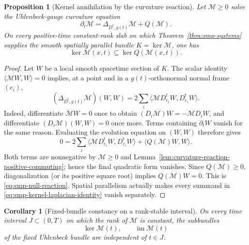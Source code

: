 \documentclass[10pt]{coll-l}
\newtheorem{corollary}[theorem]{Corollary}
\newtheorem{proposition}[theorem]{Proposition}
\theoremstyle{definition}
\theoremstyle{remark}
\numberwithin{section}{chapter}
\numberwithin{equation}{chapter}
\begin{document}
\begin{proposition}[Kernel annihilation by the curvature reaction]
\label{prop:curvature-kernel-annihilation}
Let $\mathcal M\geq0$ solve the Uhlenbeck-gauge curvature equation
\[
                 \partial_t\mathcal M
                 =\Delta_{D^t,g(t)}\mathcal M+Q(\mathcal M).
\]
On every positive-time constant-rank slab on which
Theorem~\ref{thm:smp-systems} supplies the smooth spatially parallel bundle
$K=\ker\mathcal M$, one has
\begin{equation}
       \ker\mathcal M(x,t)\subseteq\ker Q(\mathcal M(x,t)).
                                                        \label{eq:smp-null-reaction}
\end{equation}
\end{proposition}

\begin{proof}
Let $W$ be a local smooth spacetime section of $K$.  The scalar identity
$\langle\mathcal MW,W\rangle=0$ implies, at a point and in a
$g(t)$-orthonormal normal frame $(e_i)$,
\begin{equation}
 (\Delta_{D^t,g(t)}\mathcal M)(W,W)
   =2\sum_i\langle\mathcal M D^t_{e_i}W,D^t_{e_i}W\rangle.
                                                        \label{eq:smp-kernel-laplacian-identity}
\end{equation}
Indeed, differentiate $\mathcal MW=0$ once to obtain
$(D_i\mathcal M)W=-\mathcal M D_iW$, and differentiate
$(D_i\mathcal M)(W,W)=0$ once more.  Terms containing $\partial_tW$
vanish for the same reason.  Evaluating the evolution equation on $(W,W)$
therefore gives
\[
 0=2\sum_i\langle\mathcal M D^t_{e_i}W,D^t_{e_i}W\rangle
     +\langle Q(\mathcal M)W,W\rangle.
\]
Both terms are nonnegative by $\mathcal M\geq0$ and
Lemma~\ref{lem:curvature-reaction-positive-commuting}; hence the final
quadratic form vanishes.  Since $Q(\mathcal M)\geq0$, diagonalization (or its
positive square root) implies $Q(\mathcal M)W=0$.  This is
\eqref{eq:smp-null-reaction}.  Spatial parallelism actually makes every
summand in \eqref{eq:smp-kernel-laplacian-identity} vanish separately.
\end{proof}

\begin{corollary}[Fixed-bundle constancy on a rank-stable interval]
\label{cor:curvature-fixed-bundle-rank-interval}
On every time interval $J\subset(0,T)$ on which the rank of
$\mathcal M$ is constant, the subbundles
\[
                   \ker\mathcal M(t),
       \qquad      \operatorname{im}\mathcal M(t)
\]
of the fixed Uhlenbeck bundle are independent of $t\in J$.
\end{corollary}
\end{document}
